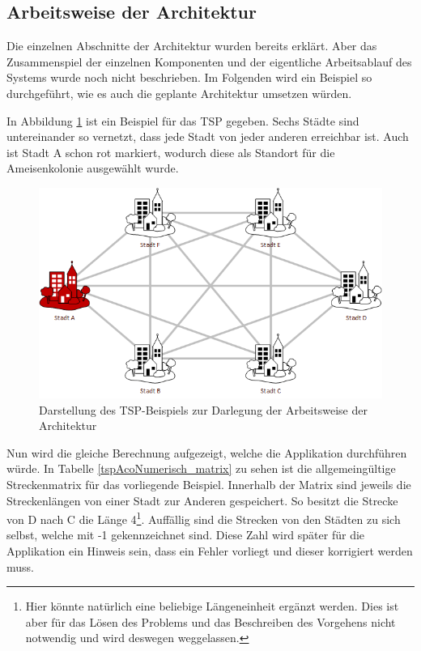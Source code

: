 \subsection{Arbeitsweise der Architektur}
	Die einzelnen Abschnitte der Architektur wurden bereits erklärt. Aber das Zusammenspiel der einzelnen Komponenten und der eigentliche Arbeitsablauf des Systems wurde noch nicht beschrieben. Im Folgenden wird ein Beispiel so durchgeführt, wie es auch die geplante Architektur umsetzen würden.
		
	In Abbildung \ref{tspAcoNumerisch} ist ein Beispiel für das TSP gegeben. Sechs Städte sind untereinander so vernetzt, dass jede Stadt von jeder anderen erreichbar ist. Auch ist Stadt A schon rot markiert, wodurch diese als Standort für die Ameisenkolonie ausgewählt wurde. 
	
	\begin{figure}[h]
		\centering
		\includegraphics[width=0.9\linewidth]{images/TSP_ACO_numerisch.png}
		\caption{Darstellung des TSP-Beispiels zur Darlegung der Arbeitsweise der Architektur}
		\label{tspAcoNumerisch}
	\end{figure}

	Nun wird die gleiche Berechnung aufgezeigt, welche die Applikation durchführen würde. In Tabelle \ref{tspAcoNumerisch_matrix} zu sehen ist die allgemeingültige Streckenmatrix für das vorliegende Beispiel. Innerhalb der Matrix sind jeweils die Streckenlängen von einer Stadt zur Anderen gespeichert. So besitzt die Strecke von D nach C die Länge 4\footnote{Hier könnte natürlich eine beliebige Längeneinheit ergänzt werden. Dies ist aber für das Lösen des Problems und das Beschreiben des Vorgehens nicht notwendig und wird deswegen weggelassen.}. Auffällig sind die Strecken von den Städten zu sich selbst, welche mit -1 gekennzeichnet sind. Diese Zahl wird später für die Applikation ein Hinweis sein, dass ein Fehler vorliegt und dieser korrigiert werden muss.
	
